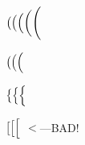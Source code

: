 \documentclass{article}
\newcommand\pig[1]{\scalerel*[5.5pt]{\Big#1}{%
  \ensurestackMath{\addstackgap[1.5pt]{\big#1}}}}
\newcommand\pigl[1]{\mathopen{\pig{#1}}}
\begin{document}
$ \big( \pig( \Big( \bigg( \Bigg($

$ \bigl( \pigl( \Bigl($

$ \bigl\{ \pigl\{ \Bigl\{$

$ \bigl[ \pigl[  \Bigl[$ $<$---BAD!
\end{document}
